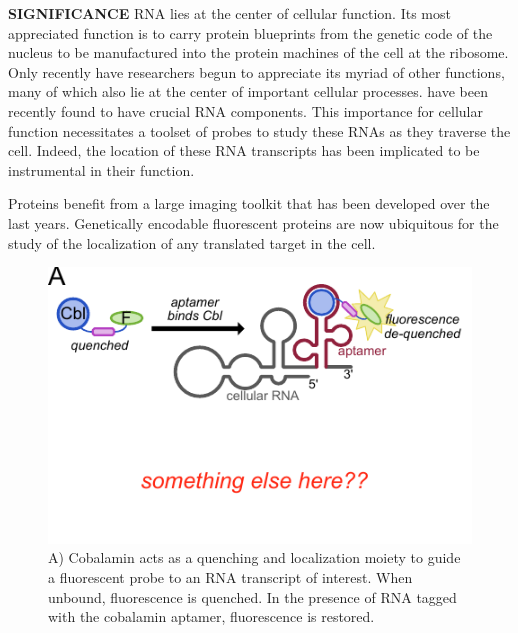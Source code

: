 
\textbf{SIGNIFICANCE}
RNA lies at the center of cellular function. Its most appreciated function is to carry protein blueprints from the genetic code of the nucleus to be manufactured into the protein machines of the cell at the ribosome. Only recently have researchers begun to appreciate its myriad of other functions, many of which also lie at the center of important cellular processes.  have been recently found to have crucial RNA components. This importance for cellular function necessitates a toolset of probes to study these RNAs as they traverse the cell. Indeed, the location of these RNA transcripts has been implicated to be instrumental in their function.\cite{Muller-McNicollHowcellsget2013a}

Proteins benefit from a large imaging toolkit that has been developed over the last  years. Genetically encodable fluorescent proteins are now ubiquitous for the study of the localization of any translated target in the cell.

\begin{figure}
\begin{centering}
\includegraphics[width=\textwidth]{figures/fig1.pdf}

\end{centering}
\footnotesize
\caption{\label{figure:riboglow}
A) Cobalamin acts as a quenching and localization moiety to guide a fluorescent probe to an RNA transcript of interest. When unbound, fluorescence is quenched. In the presence of RNA tagged with the cobalamin aptamer, fluorescence is restored.
}
\end{figure}

